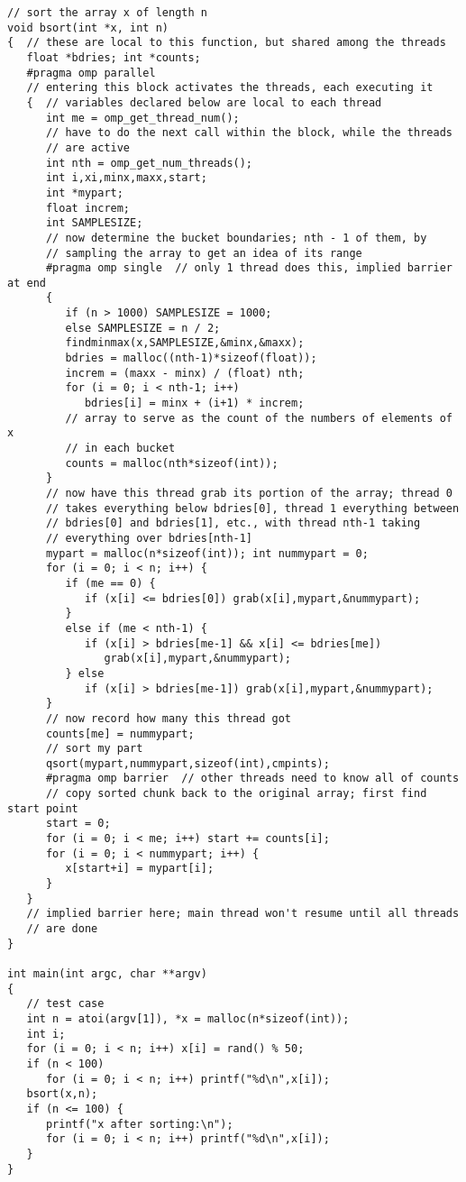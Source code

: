 \begin{lstlisting}
// sort the array x of length n
void bsort(int *x, int n)
{  // these are local to this function, but shared among the threads
   float *bdries; int *counts;
   #pragma omp parallel
   // entering this block activates the threads, each executing it
   {  // variables declared below are local to each thread
      int me = omp_get_thread_num();
      // have to do the next call within the block, while the threads
      // are active
      int nth = omp_get_num_threads();
      int i,xi,minx,maxx,start;
      int *mypart;
      float increm;
      int SAMPLESIZE;
      // now determine the bucket boundaries; nth - 1 of them, by
      // sampling the array to get an idea of its range
      #pragma omp single  // only 1 thread does this, implied barrier at end
      {
         if (n > 1000) SAMPLESIZE = 1000;
         else SAMPLESIZE = n / 2;
         findminmax(x,SAMPLESIZE,&minx,&maxx);
         bdries = malloc((nth-1)*sizeof(float));
         increm = (maxx - minx) / (float) nth;
         for (i = 0; i < nth-1; i++)
            bdries[i] = minx + (i+1) * increm;
         // array to serve as the count of the numbers of elements of x
         // in each bucket
         counts = malloc(nth*sizeof(int));
      }
      // now have this thread grab its portion of the array; thread 0
      // takes everything below bdries[0], thread 1 everything between
      // bdries[0] and bdries[1], etc., with thread nth-1 taking
      // everything over bdries[nth-1]
      mypart = malloc(n*sizeof(int)); int nummypart = 0;
      for (i = 0; i < n; i++) {
         if (me == 0) {
            if (x[i] <= bdries[0]) grab(x[i],mypart,&nummypart);
         }
         else if (me < nth-1) {
            if (x[i] > bdries[me-1] && x[i] <= bdries[me])
               grab(x[i],mypart,&nummypart);
         } else
            if (x[i] > bdries[me-1]) grab(x[i],mypart,&nummypart);
      }
      // now record how many this thread got
      counts[me] = nummypart;
      // sort my part
      qsort(mypart,nummypart,sizeof(int),cmpints);
      #pragma omp barrier  // other threads need to know all of counts
      // copy sorted chunk back to the original array; first find start point
      start = 0;
      for (i = 0; i < me; i++) start += counts[i];
      for (i = 0; i < nummypart; i++) {
         x[start+i] = mypart[i];
      }
   }
   // implied barrier here; main thread won't resume until all threads
   // are done
}

int main(int argc, char **argv)
{
   // test case
   int n = atoi(argv[1]), *x = malloc(n*sizeof(int));
   int i;
   for (i = 0; i < n; i++) x[i] = rand() % 50;
   if (n < 100)
      for (i = 0; i < n; i++) printf("%d\n",x[i]);
   bsort(x,n);
   if (n <= 100) {
      printf("x after sorting:\n");
      for (i = 0; i < n; i++) printf("%d\n",x[i]);
   }
}
\end{lstlisting}

